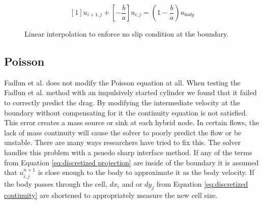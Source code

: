 \documentclass[onehalf,11pt]{beavtex}
\begin{document}
\begin{equation}
\left[1\right]u_{i+1,j} + \left[-\frac{b}{a}\right]u_{i,j} = \left(1-\frac{b}{a}\right)u_{body}
\label{eq:ID intermediate velocity interpolation}
\end{equation}

\begin{figure}[htb]
	\centering
	
	\caption{Linear interpolation to enforce no slip condition at the boundary.}
	\label{fig:ID linear interpolation}
\end{figure}

\subsection{Poisson}
Fadlun et al. does not modify the Poisson equation at all.
When testing the Fadlun et al. method with an impulsively started cylinder we found that it failed to correctly predict the drag.
By modifying the intermediate velocity at the boundary without compensating for it the continuity equation is not satisfied.
This error creates a mass source or sink at each hybrid node. 
In certain flows, the lack of mass continuity will cause the solver to poorly predict the flow or be unstable.
There are many ways researchers have tried to fix this.
The solver handles this problem with a psuedo sharp interface method. 
If any of the terms from Equation \eqref{eq:discretized projection} are inside of the boundary it is assumed that $u_{i,j}^{n+1}$ is close enough to the body to approximate it as the body velocity.
If the body passes through the cell, $dx_i$ and or $dy_j$ from Equation \eqref{eq:discretized continuity} are shortened to appropriately measure the new cell size.
\end{document}
